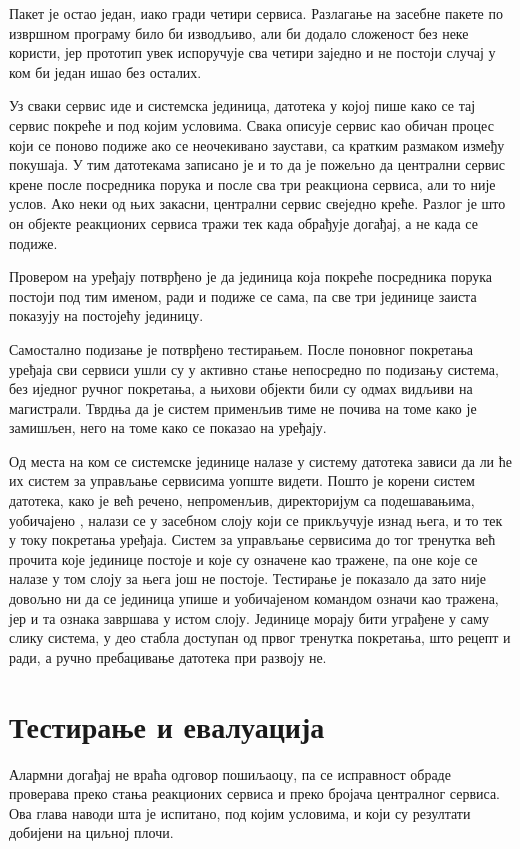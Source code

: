 \documentclass[12pt,oneside]{memoir}
\begin{document}
Пакет је остао један, иако гради четири сервиса. Разлагање на засебне пакете по извршном
програму било би изводљиво, али би додало сложеност без неке користи, јер прототип увек
испоручује сва четири заједно и не постоји случај у ком би један ишао без осталих.

Уз сваки сервис иде и системска јединица, датотека у којој
пише како се тај сервис покреће и под којим условима. Свака описује сервис као обичан процес
који се поново подиже ако се неочекивано заустави, са кратким размаком између покушаја.
У тим датотекама записано је и то да је пожељно да централни сервис крене после посредника
порука и после сва три реакциона сервиса, али то није услов. Ако неки од њих закасни,
централни сервис свеједно креће. Разлог је што он објекте реакционих сервиса тражи тек када обрађује
догађај, а не када се подиже.

Провером на уређају потврђено је да јединица која покреће посредника порука постоји под тим
именом, ради и подиже се сама, па све три јединице заиста показују на постојећу јединицу.

Самостално подизање је потврђено тестирањем. После поновног покретања уређаја сви сервиси ушли
су у активно стање непосредно по подизању система, без иједног ручног покретања, а њихови
објекти били су одмах видљиви на магистрали. Тврдња да је систем применљив тиме не почива на
томе како је замишљен, него на томе како се показао на уређају.

Од места на ком се системске јединице налазе у систему датотека зависи да ли ће их систем за
управљање сервисима уопште видети. Пошто је корени систем датотека, како је већ речено,
непроменљив, директоријум са подешавањима, уобичајено , налази се у засебном
слоју који се прикључује изнад њега, и то тек у току покретања уређаја. Систем за управљање
сервисима до тог тренутка већ прочита које јединице постоје и које су означене као тражене,
па оне које се налазе у том слоју за њега још не постоје. Тестирање је показало да зато
није довољно ни да се јединица упише и уобичајеном командом означи као тражена, јер и та
ознака завршава у истом слоју. Јединице морају бити уграђене у саму слику система, у део
стабла доступан од првог тренутка покретања, што рецепт и ради, а ручно пребацивање
датотека при развоју не.

\chapter{Тестирање и евалуација}
\label{chp:testiranje}
Алармни догађај не враћа одговор пошиљаоцу, па се исправност обраде проверава преко стања
реакционих сервиса и преко бројача централног сервиса. Ова глава наводи шта је испитано, под
којим условима, и који су резултати добијени на циљној плочи.
\end{document}

